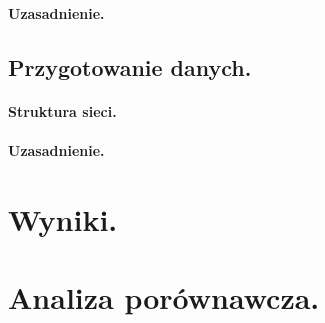 \documentclass[a4paper, 11pt]{article}
\begin{document}
\paragraph{Uzasadnienie.}
\subsection{Przygotowanie danych.}
\paragraph{Struktura sieci.}
\paragraph{Uzasadnienie.}

\section{Wyniki.}


\section{Analiza porównawcza.}
\end{document}
